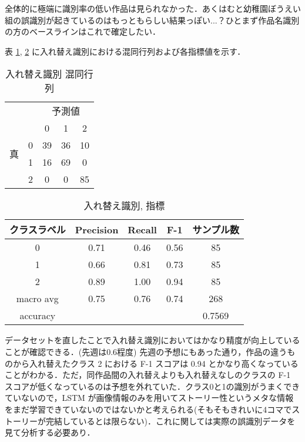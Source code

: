\documentclass[onecolumn]{ujarticle}   %
\begin{document}
  全体的に極端に識別率の低い作品は見られなかった．あくはむと幼稚園ぼうえい組の誤識別が起きているのはもっともらしい結果っぽい...？ひとまず作品名識別の方のベースラインはこれで確定したい．

  表 \ref{tab:confusion_matrix_fourscene}, \ref{tab:exp_fourscene_measure} に入れ替え識別における混同行列および各指標値を示す．

  \begin{table}[h]
  	\begin{center}
  		\caption{入れ替え識別 混同行列}
  		\label{tab:confusion_matrix_fourscene}
  		\vspace{-4mm}
  		\begin{tabular}{|c|c||c|c|c|}\hline
  			\multicolumn{2}{|c||}{}&\multicolumn{3}{|c|}{予測値} \\ \cline{3-5}
  			\multicolumn{2}{|c||}{}&0&1&2 \\ \hline \hline
  			\multirow{2}{*}{真}&0 &39&36&10\\ \cline{2-5}
  			\multirow{2}{*}{値}&1 &16&69&0\\ \cline{2-5}
  			&2 &0&0&85\\ \hline
  		\end{tabular}
  	\end{center}
  \end{table}

  \begin{table}[h]
  	\centering
  	\caption{入れ替え識別, 指標}
  	\vspace{-3mm}
  	\label{tab:exp_fourscene_measure}
  	\begin{tabular}{|c|c|c|c|c|} \hline
  		クラスラベル&Precision&Recall&F-1&サンプル数\\ \hline\hline
  		0&0.71&0.46&0.56&85\\ \hline
  		1&0.66&0.81&0.73&85\\ \hline
  		2&0.89&1.00&0.94&85\\ \hline
  		macro avg&0.75&0.76&0.74&268\\ \hline
  		accuracy&&&&0.7569\\ \hline
  	\end{tabular}
  \end{table}

  データセットを直したことで入れ替え識別においてはかなり精度が向上していることが確認できる．(先週は0.6程度)
  先週の予想にもあった通り，作品の違うものから入れ替えたクラス 2 における F-1 スコアは 0.94 とかなり高くなっていることがわかる．ただ，同作品間の入れ替えよりも入れ替えなしのクラスの F-1 スコアが低くなっているのは予想を外れていた．クラス0と1の識別がうまくできていないので，LSTM が画像情報のみを用いてストーリー性というメタな情報をまだ学習できていないのではないかと考えられる(そもそもきれいに4コマでストーリーが完結しているとは限らない)．これに関しては実際の誤識別データを見て分析する必要あり．
\end{document}
